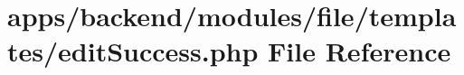 \hypertarget{backend_2modules_2file_2templates_2edit_success_8php}{\section{apps/backend/modules/file/templates/edit\-Success.php File Reference}
\label{backend_2modules_2file_2templates_2edit_success_8php}
}

